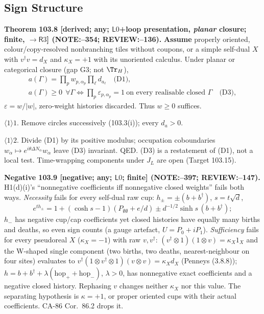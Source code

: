 \subsection{Sign Structure}

\textbf{Theorem 103.8 [derived; any; \(\mathsf L0\)+loop presentation, \emph{planar} closure; finite, \(\to\mathsf R3\)] (NOTE:--354; REVIEW:--136).}
\textbf{Assume} properly oriented, colour/copy-resolved nonbranching tiles without coupons, or a simple self-dual \(X\) with
\(v^\dagger v=d_X\) and \(\kappa_X=+1\) with its unoriented calculus. Under planar or categorical closure (gap G3; not \(\Tr_H\)),
\[\begin{gathered} a(\Gamma)=\prod_pw_{p,\alpha_p}\prod_{\ell}d_{a_\ell}\quad\text{(D1)},\\
 a(\Gamma)\ge0\ \ \forall\Gamma\iff\prod_p\varepsilon_{p,\alpha_p}=1\ \text{on every realisable closed }\Gamma\quad\text{(D3)}, \end{gathered}\]
\(\varepsilon=w/|w|\), zero-weight histories discarded. Thus \(w\ge0\) suffices.
\par\(\langle1\rangle1\). Remove circles successively (103.3(i)); every \(d_a>0\).
\par\(\langle1\rangle2\). Divide (D1) by its positive modulus; occupation coboundaries \(w_\alpha\mapsto e^{i\theta\Delta N_\alpha}w_\alpha\) leave (D3) invariant. QED.
(D3) is a restatement of (D1), not a local test. Time-wrapping components under \(J_L\) are open (Target 103.15).

\textbf{Negative 103.9 [negative; any; \(\mathsf L0\); finite] (NOTE:--397; REVIEW:--147).}\newline
H1(d)(i)'s ``nonnegative coefficients iff nonnegative closed weights'' fails both ways.
\emph{Necessity} fails for every self-dual raw cup: \(h_\pm=\pm(b+b^\dagger)\), \(s=t\sqrt d\),
\[ e^{th_\pm}=1+(\cosh s-1)(P_{\emptyset\emptyset}+e/d)\pm d^{-1/2}\sinh s\,(b+b^\dagger); \]
\(h_-\) has negative cup/cap coefficients yet
closed histories have equally many births and deaths, so even sign counts (a gauge artefact, \(U=P_0+iP_1\)).
\emph{Sufficiency} fails for every pseudoreal \(X\) (\(\kappa_X=-1\)) with raw \(v,v^\dagger\): \((v^\dagger\otimes1)(1\otimes v)=\kappa_X1_X\)
and the W-shaped single component (two births, two deaths, nearest-neighbour on four sites) evaluates to
\(v^\dagger(1\otimes v^\dagger\otimes1)(v\otimes v)=\kappa_Xd_X\) (Penneys (3.8.8)); \(h=b+b^\dagger+\lambda(\mathrm{hop}_++\mathrm{hop}_-)\),
\(\lambda>0\), has nonnegative exact coefficients and a negative closed history. Rephasing \(v\) changes neither \(\kappa_X\) nor this value.
The separating hypothesis is \(\kappa=+1\), or proper oriented cups with their actual coefficients. CA-86 Cor.~86.2 drops it.

